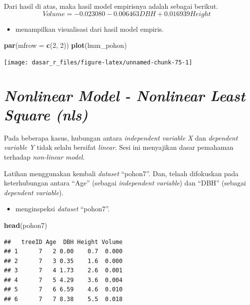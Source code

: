 \documentclass[
  12pt,
  a4paper,
]{scrbook}
\newenvironment{Shaded}{\begin{snugshade}}{\end{snugshade}}
\newcommand{\DataTypeTok}[1]{\textcolor[rgb]{0.13,0.29,0.53}{#1}}
\newcommand{\DecValTok}[1]{\textcolor[rgb]{0.00,0.00,0.81}{#1}}
\newcommand{\KeywordTok}[1]{\textcolor[rgb]{0.13,0.29,0.53}{\textbf{#1}}}
\newcommand{\NormalTok}[1]{#1}
\providecommand{\tightlist}{%
  \setlength{\itemsep}{0pt}\setlength{\parskip}{0pt}}
\begin{document}
Dari hasil di atas, maka hasil model empirisnya adalah sebagai berikut.
\[Volume = -0.023080 - 0.006463 DBH + 0.016939 Height \]

\begin{itemize}
\tightlist
\item
  menampilkan visualisasi dari hasil model empiris.
\end{itemize}

\begin{Shaded}
\begin{Highlighting}[]
\KeywordTok{par}\NormalTok{(}\DataTypeTok{mfrow =} \KeywordTok{c}\NormalTok{(}\DecValTok{2}\NormalTok{, }\DecValTok{2}\NormalTok{))}
\KeywordTok{plot}\NormalTok{(lmm_pohon)}
\end{Highlighting}
\end{Shaded}

\texttt{[image: dasar\_r\_files/figure-latex/unnamed-chunk-75-1]}

\newpage

\hypertarget{nonlinear-model---nonlinear-least-square-nls}{%
\section{\texorpdfstring{\emph{Nonlinear Model - Nonlinear Least Square
(nls)}}{Nonlinear Model - Nonlinear Least Square (nls)}}\label{nonlinear-model---nonlinear-least-square-nls}}

Pada beberapa kasus, hubungan antara \emph{independent variable X} dan
\emph{dependent variable Y} tidak selalu bersifat \emph{linear}. Sesi
ini menyajikan dasar pemahaman terhadap \emph{non-linear model}.

Latihan menggunakan kembali \emph{dataset} ``pohon7''. Dan, telaah
difokuskan pada keterhubungan antara ``Age'' (sebagai \emph{independent
variable}) dan ``DBH'' (sebagai \emph{dependent variable}).

\begin{itemize}
\tightlist
\item
  menginspeksi \emph{dataset} ``pohon7''.
\end{itemize}

\begin{Shaded}
\begin{Highlighting}[]
\KeywordTok{head}\NormalTok{(pohon7)}
\end{Highlighting}
\end{Shaded}

\begin{verbatim}
##   treeID Age  DBH Height Volume
## 1      7   2 0.00    0.7  0.000
## 2      7   3 0.35    1.6  0.000
## 3      7   4 1.73    2.6  0.001
## 4      7   5 4.29    3.6  0.004
## 5      7   6 6.59    4.6  0.010
## 6      7   7 8.38    5.5  0.018
\end{verbatim}
\end{document}
